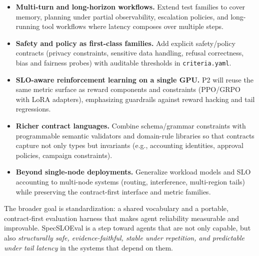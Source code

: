 \documentclass[11pt]{article}
\begin{document}
\begin{itemize}[leftmargin=12pt]
    \item \textbf{Multi-turn and long-horizon workflows.}
    Extend test families to cover memory, planning under partial observability, escalation policies, and long-running tool workflows where latency composes over multiple steps.

    \item \textbf{Safety and policy as first-class families.}
    Add explicit safety/policy contracts (privacy constraints, sensitive data handling, refusal correctness, bias and fairness probes) with auditable thresholds in \texttt{criteria.yaml}.

    \item \textbf{SLO-aware reinforcement learning on a single GPU.}
    P2 will reuse the same metric surface as reward components and constraints (PPO/GRPO with LoRA adapters), emphasizing guardrails against reward hacking and tail regressions.

    \item \textbf{Richer contract languages.}
    Combine schema/grammar constraints with programmable semantic validators and domain-rule libraries so that contracts capture not only types but invariants (e.g., accounting identities, approval policies, campaign constraints).

    \item \textbf{Beyond single-node deployments.}
    Generalize workload models and SLO accounting to multi-node systems (routing, interference, multi-region tails) while preserving the contract-first interface and metric families.
\end{itemize}

The broader goal is standardization: a shared vocabulary and a portable, contract-first evaluation harness that makes agent reliability measurable and improvable.
SpecSLOEval is a step toward agents that are not only capable, but also \emph{structurally safe, evidence-faithful, stable under repetition, and predictable under tail latency} in the systems that depend on them.
\end{document}
